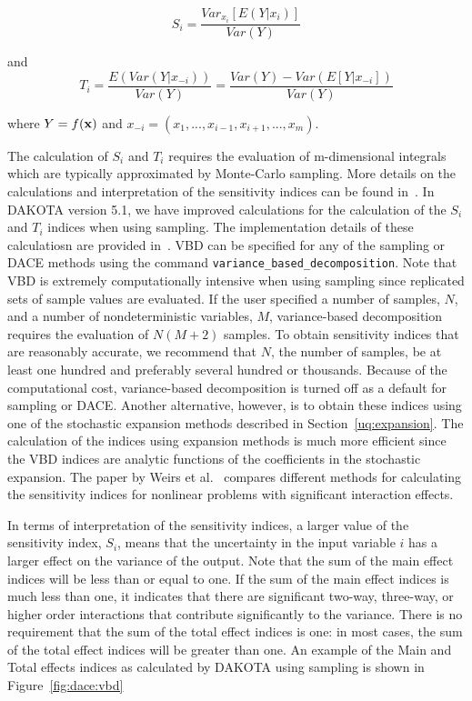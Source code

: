 \begin{equation}
S_{i}=\frac{Var_{x_{i}}[E(Y|x_{i})]}{Var(Y)} \label{eq:VBD_Si}
\end{equation}

and 
\begin{equation}
T_{i}=\frac{E(Var(Y|x_{-i}))}{Var(Y)}=\frac{Var(Y)-Var(E[Y|x_{-i}])}{Var(Y)} \label{eq:VBD_Ti}
\end{equation}

where $Y=f({\bf x})$ and ${x_{-i}=(x_{1},...,x_{i-1},x_{i+1},...,x_{m})}$.

The calculation of $S_{i}$ and $T_{i}$ requires the evaluation of 
m-dimensional integrals which are typically approximated by Monte-Carlo 
sampling. More details on the
calculations and interpretation of the sensitivity indices can be
found in~\cite{Sal04}. In DAKOTA version 5.1, we have 
improved calculations for the calculation of the $S_{i}$ and $T_{i}$ 
indices when using sampling.  The implementation details of these 
calculatiosn are provided in~\cite{Weirs10}. 
VBD can be specified for any of the sampling or DACE methods using the 
command \texttt{variance\_based\_decomposition}.
Note that VBD is extremely computationally intensive when using sampling 
since replicated sets of sample values are evaluated. If the
user specified a number of samples, $N$, and a number of
nondeterministic variables, $M$, variance-based decomposition
requires the evaluation of $N(M+2)$ samples. To obtain
sensitivity indices that are reasonably accurate, we recommend that
$N$, the number of samples, be at least one hundred and
preferably several hundred or thousands. Because of the computational
cost, variance-based decomposition is turned off as a default
for sampling or DACE.  Another alternative, however, is to obtain 
these indices using one of the stochastic expansion methods 
described in Section~\ref{uq:expansion}. The calculation 
of the indices using expansion methods is much more efficient 
since the VBD indices are analytic functions of the coefficients 
in the stochastic expansion. The paper by Weirs et al.~\cite{Weirs10}
compares different methods for calculating the sensitivity 
indices for nonlinear problems with significant interaction effects.

In terms of interpretation of the sensitivity indices, a larger value of
the sensitivity index, $S_{i}$,
means that the uncertainty in the input variable $i$ has a
larger effect on the variance of the output. Note that the 
sum of the main effect indices will be less than or equal to one. 
If the sum of the main effect indices is much less than one, 
it indicates that there are significant two-way, three-way, or higher
order interactions that contribute significantly to the variance. 
There is no requirement that the sum of the total effect indices 
is one:  in most cases, the sum of the total effect indices will be 
greater than one.  An example of the Main and Total effects 
indices as calculated by DAKOTA using sampling is shown 
in Figure~\ref{fig:dace:vbd}

